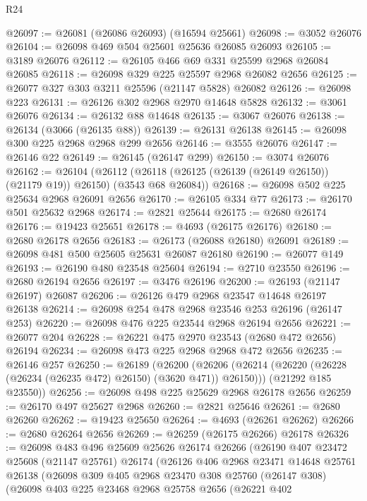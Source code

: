 \begin{lexlean}{R24}
\begin{coremodule}
@26097 := @26081 (@26086 @26093) (@16594 @25661)
@26098 := @3052 @26076
@26104 := @26098 @469 @504 @25601 @25636 @26085 @26093
@26105 := @3189 @26076
@26112 := @26105 @466 @69 @331 @25599 @2968 @26084 @26085
@26118 := @26098 @329 @225 @25597 @2968 @26082 @2656
@26125 := @26077 @327 @303 @3211 @25596 (@21147 @5828) @26082
@26126 := @26098 @223
@26131 := @26126 @302 @2968 @2970 @14648 @5828
@26132 := @3061 @26076
@26134 := @26132 @88 @14648
@26135 := @3067 @26076
@26138 := @26134 (@3066 (@26135 @88))
@26139 := @26131 @26138
@26145 := @26098 @300 @225 @2968 @2968 @299 @2656
@26146 := @3555 @26076
@26147 := @26146 @22
@26149 := @26145 (@26147 @299)
@26150 := @3074 @26076
@26162 := @26104
    (@26112 (@26118 (@26125 (@26139 (@26149 @26150)) (@21179 @19)) @26150) (@3543 @68 @26084))
@26168 := @26098 @502 @225 @25634 @2968 @26091 @2656
@26170 := @26105 @334 @77
@26173 := @26170 @501 @25632 @2968
@26174 := @2821 @25644
@26175 := @2680 @26174
@26176 := @19423 @25651
@26178 := @4693 (@26175 @26176)
@26180 := @2680 @26178 @2656
@26183 := @26173 (@26088 @26180) @26091
@26189 := @26098 @481 @500 @25605 @25631 @26087 @26180
@26190 := @26077 @149
@26193 := @26190 @480 @23548 @25604
@26194 := @2710 @23550
@26196 := @2680 @26194 @2656
@26197 := @3476 @26196
@26200 := @26193 (@21147 @26197) @26087
@26206 := @26126 @479 @2968 @23547 @14648 @26197 @26138
@26214 := @26098 @254 @478 @2968 @23546 @253 @26196 (@26147 @253)
@26220 := @26098 @476 @225 @23544 @2968 @26194 @2656
@26221 := @26077 @204
@26228 := @26221 @475 @2970 @23543 (@2680 @472 @2656) @26194
@26234 := @26098 @473 @225 @2968 @2968 @472 @2656
@26235 := @26146 @257
@26250 := @26189
    (@26200
      (@26206 (@26214 (@26220 (@26228 (@26234 (@26235 @472) @26150) (@3620 @471)) @26150)))
      (@21292 @185 @23550))
@26256 := @26098 @498 @225 @25629 @2968 @26178 @2656
@26259 := @26170 @497 @25627 @2968
@26260 := @2821 @25646
@26261 := @2680 @26260
@26262 := @19423 @25650
@26264 := @4693 (@26261 @26262)
@26266 := @2680 @26264 @2656
@26269 := @26259 (@26175 @26266) @26178
@26326 := @26098
    @483
    @496
    @25609
    @25626
    @26174
    @26266
    (@26190
      @407
      @23472
      @25608
      (@21147 @25761)
      @26174
      (@26126
        @406
        @2968
        @23471
        @14648
        @25761
        @26138
        (@26098
          @309
          @405
          @2968
          @23470
          @308
          @25760
          (@26147 @308)
          (@26098
            @403
            @225
            @23468
            @2968
            @25758
            @2656
            (@26221
              @402

\end{coremodule}
\end{lexlean}
